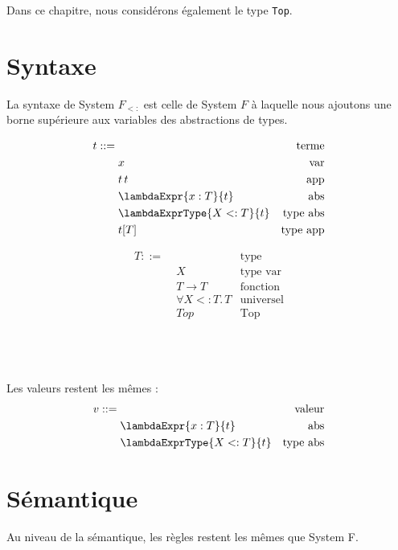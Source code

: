 Dans ce chapitre, nous considérons également le type \verb|Top|.

\section{Syntaxe}

La syntaxe de System $F_{<:}$ est celle de System $F$ à laquelle nous ajoutons
une borne supérieure aux variables des abstractions de types.

\begin{minipage}{0.45\textwidth}
  \begin{align*}
    t ::= & \, & \text{terme} \\
          & \; x & \text{var} \\
          & \; t \, t & \text{app} \\
          & \; \lambdaExpr{x : T}{t} & \text{abs} \\
          & \; \lambdaExprType{X <: T}{t} & \text{type abs} \\
          & \; t[T] & \text{type app}
  \end{align*}
\end{minipage}
\begin{minipage}{0.45\textwidth}
  \begin{align*}
    T ::= & \, & \text{type} \\
          & \; X & \text{type var} \\
          & \; T \rightarrow T & \text{fonction} \\
          & \; \forall X <: T. \, T & \text{universel} \\
          & \; Top & \text{Top}
  \end{align*}
\end{minipage}
\\
\\
\\
Les valeurs restent les mêmes :
\begin{align*}
  v ::= & \, & \text{valeur} \\
        & \; \lambdaExpr{x : T}{t} & \text{abs} \\
        & \; \lambdaExprType{X <: T}{t} & \text{type abs}
\end{align*}

\section{Sémantique}

Au niveau de la sémantique, les règles restent les mêmes que System F.

